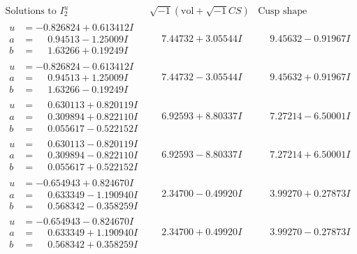 \documentclass[1p]{elsarticle_modified}
\theoremstyle{definition}
\newcommand{\I}{\sqrt{-1}}
\begin{document}
$$\begin{array}{c|c|c}  
\text{Solutions to }I^u_{2}& \I (\text{vol} + \sqrt{-1}CS) & \text{Cusp shape}\\
 \hline 
\begin{aligned}
u &= -0.826824 + 0.613412 I \\
a &= \phantom{-}0.94513 - 1.25009 I \\
b &= \phantom{-}1.63266 + 0.19249 I\end{aligned}
 & \phantom{-}7.44732 + 3.05544 I & \phantom{-}9.45632 - 0.91967 I \\ \hline\begin{aligned}
u &= -0.826824 - 0.613412 I \\
a &= \phantom{-}0.94513 + 1.25009 I \\
b &= \phantom{-}1.63266 - 0.19249 I\end{aligned}
 & \phantom{-}7.44732 - 3.05544 I & \phantom{-}9.45632 + 0.91967 I \\ \hline\begin{aligned}
u &= \phantom{-}0.630113 + 0.820119 I \\
a &= \phantom{-}0.309894 + 0.822110 I \\
b &= \phantom{-}0.055617 - 0.522152 I\end{aligned}
 & \phantom{-}6.92593 + 8.80337 I & \phantom{-}7.27214 - 6.50001 I \\ \hline\begin{aligned}
u &= \phantom{-}0.630113 - 0.820119 I \\
a &= \phantom{-}0.309894 - 0.822110 I \\
b &= \phantom{-}0.055617 + 0.522152 I\end{aligned}
 & \phantom{-}6.92593 - 8.80337 I & \phantom{-}7.27214 + 6.50001 I \\ \hline\begin{aligned}
u &= -0.654943 + 0.824670 I \\
a &= \phantom{-}0.633349 - 1.190940 I \\
b &= \phantom{-}0.568342 - 0.358259 I\end{aligned}
 & \phantom{-}2.34700 - 0.49920 I & \phantom{-}3.99270 + 0.27873 I \\ \hline\begin{aligned}
u &= -0.654943 - 0.824670 I \\
a &= \phantom{-}0.633349 + 1.190940 I \\
b &= \phantom{-}0.568342 + 0.358259 I\end{aligned}
 & \phantom{-}2.34700 + 0.49920 I & \phantom{-}3.99270 - 0.27873 I \\ \hline\begin{aligned}

\end{aligned}
\end{array}$$
\end{document}
